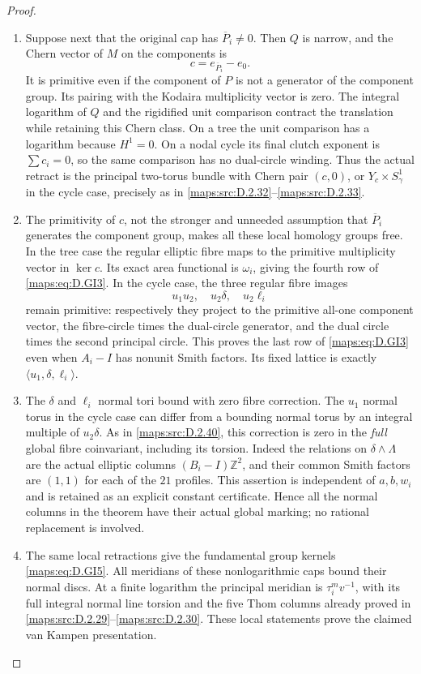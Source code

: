 \begin{proof}
\begin{enumerate}[label=\arabic*.,leftmargin=*]
\item Suppose next that the original cap has
$\overline P_i\ne0$. Then $Q$ is narrow, and the
Chern vector of $M$ on the components is
\[
                         c=e_{\overline P_i}-e_0.
\]
It is primitive even if the component of $P$
is not a generator of the component group.
Its pairing with the Kodaira multiplicity vector
is zero. The integral logarithm of $Q$ and the
rigidified unit comparison contract the translation
while retaining this Chern class. On a tree the
unit comparison has a logarithm because $H^1=0$.
On a nodal cycle its final clutch exponent is
$\sum c_i=0$, so the same comparison has no
dual-circle winding. Thus the actual retract is
the principal two-torus bundle with Chern pair
$(c,0)$, or $Y_c\times S^1_\gamma$ in the cycle
case, precisely as in \ref{maps:src:D.2.32}--\ref{maps:src:D.2.33}.

\item The primitivity of $c$, not the stronger and
unneeded assumption that $\overline P_i$ generates
the component group, makes all these local homology
groups free. In the tree case the regular elliptic
fibre maps to the primitive multiplicity vector in
$\ker c$. Its exact area functional is $\omega_i$,
giving the fourth row of \eqref{maps:eq:D.GI3}. In the cycle case,
the three regular fibre images
\[
                       u_1u_2,\quad u_2\delta,\quad u_2\ell_i
\]
remain primitive: respectively they project to the
primitive all-one component vector, the fibre-circle
times the dual-circle generator, and the dual circle
times the second principal circle. This proves the
last row of \eqref{maps:eq:D.GI3} even when $A_i-I$ has nonunit
Smith factors. Its fixed lattice is exactly
$\langle u_1,\delta,\ell_i\rangle$.

\item The $\delta$ and $\ell_i$ normal tori bound with
zero fibre correction. The $u_1$ normal torus in
the cycle case can differ from a bounding normal
torus by an integral multiple of $u_2\delta$.
As in \ref{maps:src:D.2.40}, this correction is zero in the
\emph{full} global fibre coinvariant, including its
torsion. Indeed the relations on $\delta\wedge\Lambda$
are the actual elliptic columns $(B_i-I)\mathbb Z^2$,
and their common Smith factors are $(1,1)$ for
each of the $21$ profiles. This assertion is
independent of $a,b,w_i$ and is retained as an
explicit constant certificate. Hence all the normal
columns in the theorem have their actual global
marking; no rational replacement is involved.

\item The same local retractions give the fundamental
group kernels \eqref{maps:eq:D.GI5}. All meridians of these
nonlogarithmic caps bound their normal discs.
At a finite logarithm the principal meridian is
$\tau_i^m v^{-1}$, with its full integral normal
line torsion and the five Thom columns already
proved in \ref{maps:src:D.2.29}--\ref{maps:src:D.2.30}. These local statements prove
the claimed van Kampen presentation.


\end{enumerate}
\end{proof}
